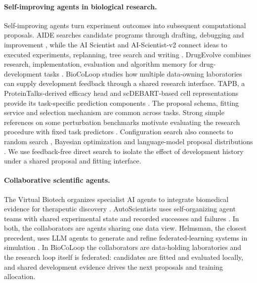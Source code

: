 \paragraph{Self-improving agents in biological research.}
Self-improving agents turn experiment outcomes into subsequent computational proposals. AIDE searches candidate programs through drafting, debugging and improvement \citep{Jiang2025AIDE}, while the AI Scientist and AI-Scientist-v2 connect ideas to executed experiments, replanning, tree search and writing \citep{Lu2024AIScientist,Yamada2025AIScientistV2}. DrugEvolve combines research, implementation, evaluation and algorithm memory for drug-development tasks \citep{Zhou2026DrugEvolve,DrugEvolveCode}. BioCoLoop studies how multiple data-owning laboratories can supply development feedback through a shared research interface. TAPB, a ProteinTalks-derived efficacy head and scDEBART-based cell representations provide its task-specific prediction components \citep{lin2025tapb,Sun2026ProteinTalks,sung2026scdebart}. The proposal schema, fitting service and selection mechanism are common across tasks. Strong simple references on some perturbation benchmarks motivate evaluating the research procedure with fixed task predictors \citep{ahlmann2025linear}. Configuration search also connects to random search \citep{bergstra2012random}, Bayesian optimization \citep{snoek2012practical} and language-model proposal distributions \citep{yang2024opro}. We use feedback-free direct search to isolate the effect of development history under a shared proposal and fitting interface.

\paragraph{Collaborative scientific agents.}
The Virtual Biotech organizes specialist AI agents to integrate biomedical evidence for therapeutic discovery \citep{Zhang2026VirtualBiotech}. AutoScientists uses self-organizing agent teams with shared experimental state and recorded successes and failures \citep{Gao2026AutoScientists}. In both, the collaborators are agents sharing one data view. Helmsman, the closest precedent, uses LLM agents to generate and refine federated-learning systems in simulation \citep{Li2025Helmsman}. In BioCoLoop the collaborators are data-holding laboratories and the research loop itself is federated: candidates are fitted and evaluated locally, and shared development evidence drives the next proposals and training allocation.

